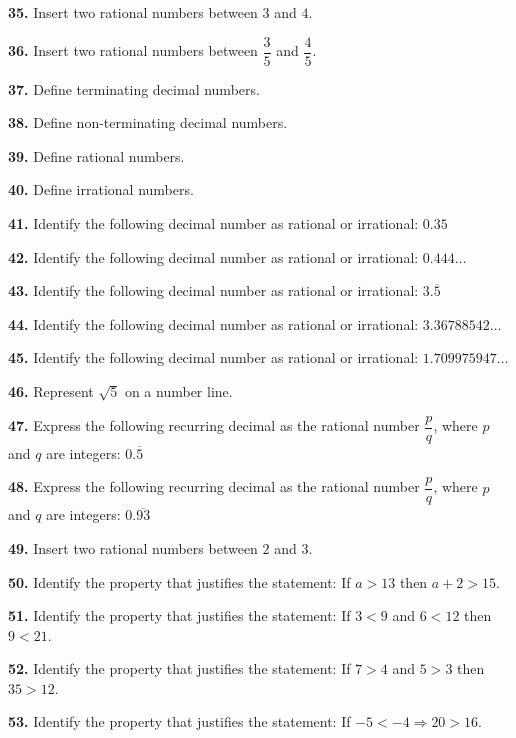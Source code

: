 \documentclass[11pt]{article}
\begin{document}
\bigskip
\noindent\textbf{35.} Insert two rational numbers between $3$ and $4$.

\bigskip
\noindent\textbf{36.} Insert two rational numbers between $\dfrac{3}{5}$ and $\dfrac{4}{5}$.

\bigskip
\noindent\textbf{37.} Define terminating decimal numbers.

\bigskip
\noindent\textbf{38.} Define non-terminating decimal numbers.

\bigskip
\noindent\textbf{39.} Define rational numbers.

\bigskip
\noindent\textbf{40.} Define irrational numbers.

\bigskip
\noindent\textbf{41.} Identify the following decimal number as rational or irrational: $0.35$

\bigskip
\noindent\textbf{42.} Identify the following decimal number as rational or irrational: $0.444\ldots$

\bigskip
\noindent\textbf{43.} Identify the following decimal number as rational or irrational: $3.\overline{5}$

\bigskip
\noindent\textbf{44.} Identify the following decimal number as rational or irrational: $3.36788542\ldots$

\bigskip
\noindent\textbf{45.} Identify the following decimal number as rational or irrational: $1.709975947\ldots$

\bigskip
\noindent\textbf{46.} Represent $\sqrt{5}$ on a number line.

\bigskip
\noindent\textbf{47.} Express the following recurring decimal as the rational number $\dfrac{p}{q}$, where $p$ and $q$ are integers: $0.\overline{5}$

\bigskip
\noindent\textbf{48.} Express the following recurring decimal as the rational number $\dfrac{p}{q}$, where $p$ and $q$ are integers: $0.\overline{93}$

\bigskip
\noindent\textbf{49.} Insert two rational numbers between $2$ and $3$.

\bigskip
\noindent\textbf{50.} Identify the property that justifies the statement: If $a>13$ then $a+2>15$.

\bigskip
\noindent\textbf{51.} Identify the property that justifies the statement: If $3<9$ and $6<12$ then $9<21$.

\bigskip
\noindent\textbf{52.} Identify the property that justifies the statement: If $7>4$ and $5>3$ then $35>12$.

\bigskip
\noindent\textbf{53.} Identify the property that justifies the statement: If $-5<-4 \Rightarrow 20>16$.
\end{document}

